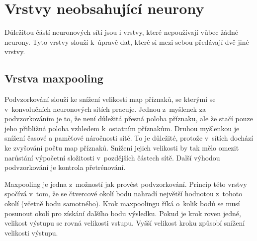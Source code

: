 \section{Vrstvy neobsahující neurony}
\label{sec:noneuron}

Důležitou částí neuronových sítí jsou i vrstvy, které nepoužívají vůbec žádné neurony.
Tyto vrstvy slouží k~úpravě dat, které si mezi sebou předávají dvě jiné vrstvy.

\subsection{Vrstva maxpooling}
\label{sub:maxpooling}

Podvzorkování slouží ke snížení velikosti map příznaků, se kterými se v~konvolučních neuronových sítích pracuje.
Jednou z~myšlenek za podvzorkováním je to, že není důležitá přesná poloha příznaku, ale že stačí pouze jeho přibližná poloha vzhledem k~ostatním příznakům.
Druhou myšlenkou je snížení časové a paměťové náročnosti sítě.
To je důležité, protože v~sítích dochází ke zvyšování počtu map příznaků.
Snížení jejich velikosti by tak mělo omezit narůstání výpočetní složitosti v~pozdějších částech sítě.
Další výhodou podvzorkování je kontrola přetrénování.

Maxpooling je jedna z~možností jak provést podvzorkování.
Princip této vrstvy spočívá v~tom, že se čtvercové okolí bodu nahradí největší hodnotou z~tohoto okolí (včetně bodu samotného).
Krok maxpoolingu říká o~kolik bodů se musí posunout okolí pro získání dalšího bodu výsledku.
Pokud je krok roven jedné, velikost výstupu se rovná velikosti vstupu.
Vyšší velikost kroku způsobí snížení velikosti výstupu.


